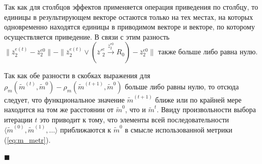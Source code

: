 \documentclass[a4paper, 12pt]{article}
\numberwithin{equation}{section}
\begin{document}
		Так как для столбцов эффектов применяется операция приведения по столбцу, то единицы в результирующем векторе остаются только на тех местах, на которых одновременно находятся единицы в приводимом векторе и векторе, по которому осуществляется приведение. В связи с этим разность $\|\bar z_2^{e(t)}-\bar z_2^{e0}\|-\|\bar z_2^{e(t)}\vee (\bar z'^e_2\xrightarrow{\bar z_2^{e0}} R_0)-\bar z_2^{e0}\|$ также больше либо равна нулю.
		
		Так как обе разности в скобках выражения для $\rho_m(\tilde m^{(t)},\tilde m^0)-\rho_m(\tilde m^{(t+1)},\tilde m^0)$ больше либо равны нулю, то отсюда следует, что функциональное значение $\tilde m^{(t+1)}$ ближе или по крайней мере находится на том же расстоянии от $\tilde m^0$, что и $\tilde m^{t}$. Ввиду произвольности выбора итерации $t$ это приводит к тому, что элементы всей последовательности $\langle\tilde m^{(0)},\tilde m^{(1)},\dots\rangle$ приближаются к $\tilde m^0$ в смысле использованной метрики (\ref{eq:m_metr}). 
	
	\hfill$\scriptstyle\blacksquare$
	
\end{document}
